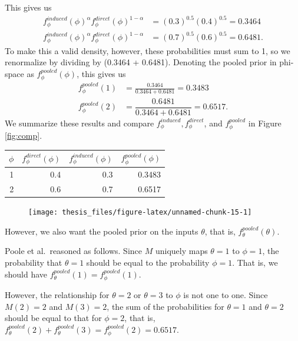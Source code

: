 \documentclass[12pt,twoside]{smiththesis}
\begin{document}
This gives us
\begin{align*}
f_\phi^{induced}(\phi)^{\alpha} f_\phi^{direct}(\phi)^{1-\alpha} &= (0.3)^{0.5}(0.4)^{0.5} = 0.3464\\
f_\phi^{induced}(\phi)^{\alpha} f_\phi^{direct}(\phi)^{1-\alpha} &= (0.7)^{0.5}(0.6)^{0.5} = 0.6481.
\end{align*}
To make this a valid density, however, these probabilities must sum to 1, so we renormalize by dividing by (0.3464 + 0.6481). Denoting the pooled prior in phi-space as \(f_\phi^{pooled}(\phi)\), this gives us
\begin{align*}
f_\phi^{pooled}(1) &= \frac{ 0.3464  }  { 0.3464 + 0.6481 } = 0.3483 \\
f_\phi^{pooled}(2) &= \dfrac{ 0.6481 } { 0.3464 + 0.6481}  =0.6517.
\end{align*}
We summarize these results and compare \(f_\phi^{induced}, f_\phi^{direct}\), and \(f_\phi^{pooled}\) in Figure \ref{fig:comp}.
\begin{multicols}{2}
\begin{table}[H]
\centering
\begin{tabular}[t]{r|r|r|r}
\hline
$\phi$ & $f_\phi^{direct}(\phi)$ & $f_\phi^{induced}(\phi)$ & $f_\phi^{pooled}(\phi)$\\
\hline
1 & 0.4 & 0.3 & 0.3483\\
\hline
2 & 0.6 & 0.7 & 0.6517\\
\hline
\end{tabular}
\end{table}
\columnbreak
\begin{figure}

{\centering \texttt{[image: thesis\_files/figure-latex/unnamed-chunk-15-1]} 

}

\caption{\label{fig:comp}}\label{fig:unnamed-chunk-15}
\end{figure}
\end{multicols}
However, we also want the pooled prior on the inputs \(\theta\), that is, \(f_\theta^{pooled}(\theta)\).

Poole et al.~reasoned as follows. Since \(M\) uniquely maps \(\theta=1\) to \(\phi =1\), the probability that \(\theta=1\) should be equal to the probability \(\phi = 1\). That is, we should have \(f_\theta^{pooled}(1) = f_\phi^{pooled}(1)\).

However, the relationship for \(\theta=2\) or \(\theta=3\) to \(\phi\) is not one to one. Since \(M(2)=2\) and \(M(3)=2\), the sum of the probabilities for \(\theta=1\) and \(\theta=2\) should be equal to that for \(\phi=2\), that is, \(f_\theta^{pooled}(2) + f_\theta^{pooled}(3) = f_\phi^{pooled}(2) = 0.6517\).
\end{document}
